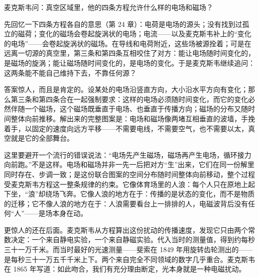 \begin{mainline}
麦克斯韦问：真空区域里，他的四条方程允许什么样的电场和磁场？

先回忆一下四条方程各自的意思（第 24 章）：电荷是电场的源头；没有找到过孤立的磁荷；变化的磁场会卷起旋涡状的电场；电流——以及麦克斯韦补上的“变化的电场”——会卷起旋涡状的磁场。在导线和电荷附近，这些场被源拴着；可是在远离一切源的真空里，第三条和第四条互相咬住了对方：能让电场随时间变化的，是磁场的旋涡；能让磁场随时间变化的，是电场的变化。于是麦克斯韦继续追问：这两条能不能自己维持下去，不靠任何源？

答案惊人，而且是肯定的。设某处的电场沿竖直方向，大小沿水平方向有变化；那么第三条和第四条合在一起强制要求：这样的电场必须随时间变化，而它的变化必然伴随一个磁场，这个磁场既垂直于电场、也垂直于传播方向；磁场的分布又随时间整体向前推移。解出来的完整图案是：电场和磁场像两堵互相垂直的波墙，手挽着手，以固定的速度向远方平移——不需要电线，不需要空气，也不需要以太，真空就是它的全部舞台。

这里要避开一个流行的错误说法：“电场先产生磁场，磁场再产生电场，循环接力向前跑。”不是这样。电场和磁场并非一先一后把对方“生”出来，它们在同一份解里同时存在、步调一致；是这份联合图案的空间分布随时间整体向前移动，整个过程受麦克斯韦方程这一整条规律的约束。它像体育场里的人浪：每个人只在原地上起下坐，“浪”却绕场飞奔。它像人浪的地方在于：传播的是状态的变化，而不是物质的迁移；它不像人浪的地方在于：人浪需要看台上一排排的人，电磁波背后没有任何“人”——是场本身在动。

\begin{center}
\end{center}

更惊人的还在后面。麦克斯韦从方程算出这份扰动的传播速度，发现它只由两个常数决定：一个来自静电实验，一个来自静磁实验。代入当时的测量值，得到约每秒三十一万千米。而当时最好的光速测量——斐索在 1849 年用旋转齿轮测出的——是每秒三十一万五千千米上下。两个来自完全不同领域的数字几乎重合。麦克斯韦在 1865 年写道：如此吻合，我们有充分理由断定，光本身就是一种电磁扰动。


\end{mainline}
